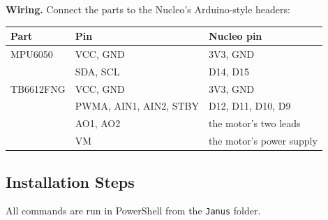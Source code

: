 \documentclass[11pt]{article}
\begin{document}
\textbf{Wiring.} Connect the parts to the Nucleo's Arduino-style headers:

\begin{center}
\begin{tabular}{@{} l l l @{}}
\toprule
\textbf{Part} & \textbf{Pin} & \textbf{Nucleo pin} \\
\midrule
MPU6050 & VCC, GND & 3V3, GND \\
 & SDA, SCL & D14, D15 \\
TB6612FNG & VCC, GND & 3V3, GND \\
 & PWMA, AIN1, AIN2, STBY & D12, D11, D10, D9 \\
 & AO1, AO2 & the motor's two leads \\
 & VM & the motor's power supply \\
\bottomrule
\end{tabular}
\end{center}

\subsection{Installation Steps}

All commands are run in PowerShell from the \texttt{Janus} folder.
\end{document}
